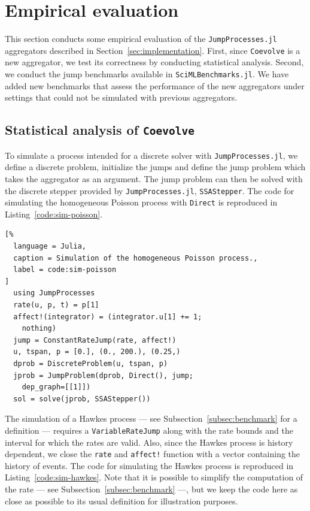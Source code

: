 \documentclass{juliacon}
\numberwithin{equation}{section}
\begin{document}
\section{Empirical evaluation} \label{sec:evaluation}

This section conducts some empirical evaluation of the \texttt{JumpProcesses.jl} aggregators described in Section~\ref{sec:implementation}. First, since \texttt{Coevolve} is a new aggregator, we test its correctness by conducting statistical analysis. Second, we conduct the jump benchmarks available in  \texttt{SciMLBenchmarks.jl}. We have added new benchmarks that assess the performance of the new aggregators under settings that could not be simulated with previous aggregators.

\subsection{Statistical analysis of \texttt{Coevolve}}

To simulate a process intended for a discrete solver with \texttt{JumpProcesses.jl}, we define a discrete problem, initialize the jumps and define the jump problem which takes the aggregator as an argument. The jump problem can then be solved with the discrete stepper provided by \texttt{JumpProcesses.jl}, \texttt{SSAStepper}. The code for simulating the homogeneous Poisson process with \texttt{Direct} is reproduced in Listing~\ref{code:sim-poisson}.

\begin{lstlisting}[%
  language = Julia,
  caption = Simulation of the homogeneous Poisson process.,
  label = code:sim-poisson
]
  using JumpProcesses
  rate(u, p, t) = p[1]
  affect!(integrator) = (integrator.u[1] += 1; 
    nothing)
  jump = ConstantRateJump(rate, affect!)
  u, tspan, p = [0.], (0., 200.), (0.25,)
  dprob = DiscreteProblem(u, tspan, p)
  jprob = JumpProblem(dprob, Direct(), jump;
    dep_graph=[[1]])
  sol = solve(jprob, SSAStepper())
\end{lstlisting}

The simulation of a Hawkes process --- see Subsection~\ref{subsec:benchmark} for a definition --- requires a \texttt{VariableRateJump} along with the rate bounds and the interval for which the rates are valid. Also, since the Hawkes process is history dependent, we close the \texttt{rate} and \texttt{affect!} function with a vector containing the history of events. The code for simulating the Hawkes process is reproduced in Listing~\ref{code:sim-hawkes}. Note that it is possible to simplify the computation of the rate --- see Subsection~\ref{subsec:benchmark} ---, but we keep the code here as close as possible to its usual definition for illustration purposes.
\end{document}
